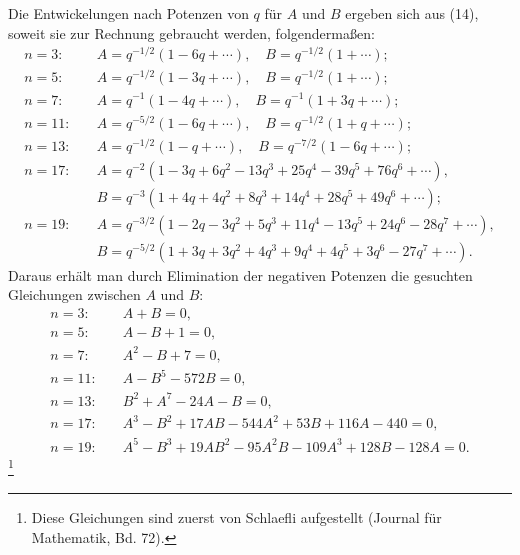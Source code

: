 \documentclass[11pt]{article}
\begin{document}
Die Entwickelungen nach Potenzen von $q$ für $A$ und $B$ ergeben sich aus (14), soweit sie zur Rechnung gebraucht werden, folgendermaßen:
\begin{align*}
 n=3:&\quad A=q^{-1/2}(1-6q+\cdots),\quad B=q^{-1/2}(1+\cdots);\\
 n=5:&\quad A=q^{-1/2}(1-3q+\cdots),\quad B=q^{-1/2}(1+\cdots);\\
 n=7:&\quad A=q^{-1}(1-4q+\cdots),\quad B=q^{-1}(1+3q+\cdots);\\
 n=11:&\quad A=q^{-5/2}(1-6q+\cdots),\quad B=q^{-1/2}(1+q+\cdots);\\
 n=13:&\quad A=q^{-1/2}(1-q+\cdots),\quad B=q^{-7/2}(1-6q+\cdots);\\
 n=17:&\quad A=q^{-2}(1-3q+6q^2-13q^3+25q^4-39q^5+76q^6+\cdots),\\
     &\quad B=q^{-3}(1+4q+4q^2+8q^3+14q^4+28q^5+49q^6+\cdots);\\
 n=19:&\quad A=q^{-3/2}(1-2q-3q^2+5q^3+11q^4-13q^5+24q^6-28q^7+\cdots),\\
     &\quad B=q^{-5/2}(1+3q+3q^2+4q^3+9q^4+4q^5+3q^6-27q^7+\cdots).
\end{align*}
Daraus erhält man durch Elimination der negativen Potenzen die gesuchten Gleichungen zwischen $A$ und $B$:
\begin{align*}
 n=3:&\quad A+B=0,\\
 n=5:&\quad A-B+1=0,\\
 n=7:&\quad A^2-B+7=0,\\
 n=11:&\quad A-B^5-572B=0,\\
 n=13:&\quad B^2+A^7-24A-B=0,\\
 n=17:&\quad A^3-B^2+17AB-544A^2+53B+116A-440=0,\\
 n=19:&\quad A^5-B^3+19AB^2-95A^2B-109A^3+128B-128A=0.
\end{align*}
\footnote{Diese Gleichungen sind zuerst von Schlaefli aufgestellt (Journal für Mathematik, Bd. 72).}
\end{document}
